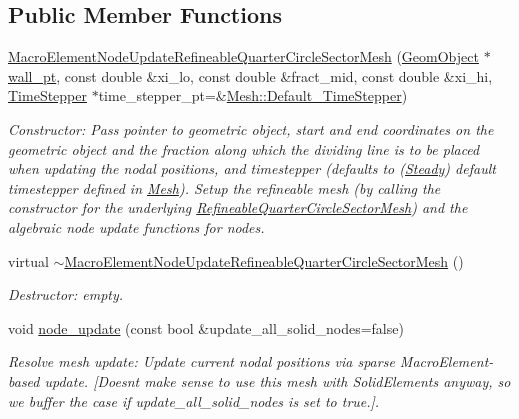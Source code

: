 \subsection*{Public Member Functions}
\begin{DoxyCompactItemize}
\item 
\hyperlink{classoomph_1_1MacroElementNodeUpdateRefineableQuarterCircleSectorMesh_ace75c8edb3d87019dc7f06152205adab}{Macro\+Element\+Node\+Update\+Refineable\+Quarter\+Circle\+Sector\+Mesh} (\hyperlink{classoomph_1_1GeomObject}{Geom\+Object} $\ast$\hyperlink{classoomph_1_1QuarterCircleSectorMesh_a0b03071bbe7e95cc6723c221ddc0998a}{wall\+\_\+pt}, const double \&xi\+\_\+lo, const double \&fract\+\_\+mid, const double \&xi\+\_\+hi, \hyperlink{classoomph_1_1TimeStepper}{Time\+Stepper} $\ast$time\+\_\+stepper\+\_\+pt=\&\hyperlink{classoomph_1_1Mesh_a12243d0fee2b1fcee729ee5a4777ea10}{Mesh\+::\+Default\+\_\+\+Time\+Stepper})
\begin{DoxyCompactList}\small\item\em Constructor\+: Pass pointer to geometric object, start and end coordinates on the geometric object and the fraction along which the dividing line is to be placed when updating the nodal positions, and timestepper (defaults to (\hyperlink{classoomph_1_1Steady}{Steady}) default timestepper defined in \hyperlink{classoomph_1_1Mesh}{Mesh}). Setup the refineable mesh (by calling the constructor for the underlying \hyperlink{classoomph_1_1RefineableQuarterCircleSectorMesh}{Refineable\+Quarter\+Circle\+Sector\+Mesh}) and the algebraic node update functions for nodes. \end{DoxyCompactList}\item 
virtual \hyperlink{classoomph_1_1MacroElementNodeUpdateRefineableQuarterCircleSectorMesh_a2d8953d309eba614524fce77c44c8d46}{$\sim$\+Macro\+Element\+Node\+Update\+Refineable\+Quarter\+Circle\+Sector\+Mesh} ()
\begin{DoxyCompactList}\small\item\em Destructor\+: empty. \end{DoxyCompactList}\item 
void \hyperlink{classoomph_1_1MacroElementNodeUpdateRefineableQuarterCircleSectorMesh_a99403c711c3fdc2a601b478deebef9fe}{node\+\_\+update} (const bool \&update\+\_\+all\+\_\+solid\+\_\+nodes=false)
\begin{DoxyCompactList}\small\item\em Resolve mesh update\+: Update current nodal positions via sparse Macro\+Element-\/based update. \mbox{[}Doesn\textquotesingle{}t make sense to use this mesh with Solid\+Elements anyway, so we buffer the case if update\+\_\+all\+\_\+solid\+\_\+nodes is set to true.\mbox{]}. \end{DoxyCompactList}\end{DoxyCompactItemize}
